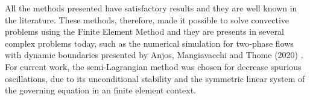 \medskip
All the methods presented have satisfactory results and
they are well known in the literature.
 These methods, therefore, made it possible to solve
 convective problems using the Finite Element Method
and they are presents in several complex problems today, 
such as the numerical simulation for two-phase flows with
dynamic boundaries presented
 by Anjos, Mangiavacchi and Thome (2020) \cite{anjos2020}.
 For current work, the semi-Lagrangian method was chosen for
 decrease spurious oscillations, due to its unconditional stability
 and the symmetric linear system of the governing equation in an finite
 element context. 


